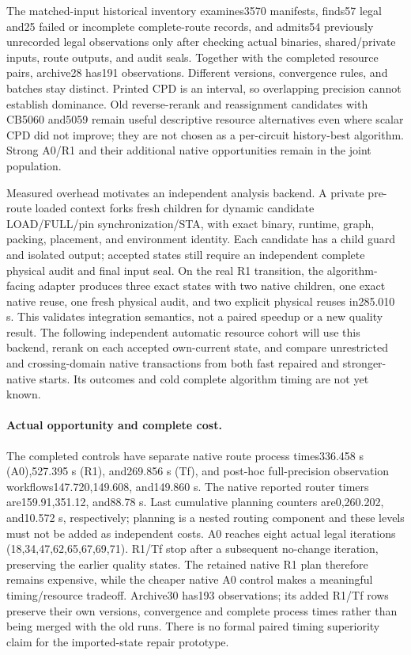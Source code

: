 The matched-input historical inventory examines3570 manifests, finds57 legal and25 failed or incomplete complete-route records, and admits54 previously unrecorded legal observations only after checking actual binaries, shared/private inputs, route outputs, and audit seals. Together with the completed resource pairs, archive28 has191 observations. Different versions, convergence rules, and batches stay distinct. Printed CPD is an interval, so overlapping precision cannot establish dominance. Old reverse-rerank and reassignment candidates with CB5060 and5059 remain useful descriptive resource alternatives even where scalar CPD did not improve; they are not chosen as a per-circuit history-best algorithm. Strong A0/R1 and their additional native opportunities remain in the joint population.

Measured overhead motivates an independent analysis backend. A private pre-route loaded context forks fresh children for dynamic candidate LOAD/FULL/pin synchronization/STA, with exact binary, runtime, graph, packing, placement, and environment identity. Each candidate has a child guard and isolated output; accepted states still require an independent complete physical audit and final input seal. On the real R1 transition, the algorithm-facing adapter produces three exact states with two native children, one exact native reuse, one fresh physical audit, and two explicit physical reuses in285.010 s. This validates integration semantics, not a paired speedup or a new quality result. The following independent automatic resource cohort will use this backend, rerank on each accepted own-current state, and compare unrestricted and crossing-domain native transactions from both fast repaired and stronger-native starts. Its outcomes and cold complete algorithm timing are not yet known.

\paragraph{Actual opportunity and complete cost.}
The completed controls have separate native route process times336.458 s (A0),527.395 s (R1), and269.856 s (Tf), and post-hoc full-precision observation workflows147.720,149.608, and149.860 s. The native reported router timers are159.91,351.12, and88.78 s. Last cumulative planning counters are0,260.202, and10.572 s, respectively; planning is a nested routing component and these levels must not be added as independent costs. A0 reaches eight actual legal iterations (18,34,47,62,65,67,69,71). R1/Tf stop after a subsequent no-change iteration, preserving the earlier quality states. The retained native R1 plan therefore remains expensive, while the cheaper native A0 control makes a meaningful timing/resource tradeoff. Archive30 has193 observations; its added R1/Tf rows preserve their own versions, convergence and complete process times rather than being merged with the old runs. There is no formal paired timing superiority claim for the imported-state repair prototype.

